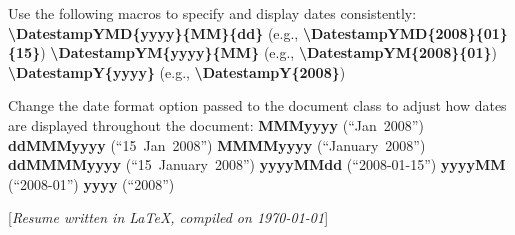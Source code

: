 \documentclass[letterpaper,MMMMyyyy,nonstopmode]{simpleresumecv}
\newcommand{\CVNote}{Resume written in \LaTeX, compiled on {\today}}
\newcommand{\Code}[1]{\mbox{\textbf{#1}}}
\newcommand{\CodeCommand}[1]{\mbox{\textbf{\textbackslash{#1}}}}
\begin{document}
\begin{Body}
\Gap
\BulletItem
Use the following macros to specify and display dates consistently:
\SubBulletItem
\CodeCommand{DatestampYMD\{yyyy\}\{MM\}\{dd\}}
(e.g., \CodeCommand{DatestampYMD\{2008\}\{01\}\{15\}})
\SubBulletItem
\CodeCommand{DatestampYM\{yyyy\}\{MM\}}
(e.g., \CodeCommand{DatestampYM\{2008\}\{01\}})
\SubBulletItem
\CodeCommand{DatestampY\{yyyy\}}
(e.g., \CodeCommand{DatestampY\{2008\}})

\Gap
\BulletItem
Change the date format option passed to the document class to adjust how dates are displayed throughout the document:
\SubBulletItem
\Code{MMMyyyy} (``Jan~2008'')
\SubBulletItem
\Code{ddMMMyyyy} (``15~Jan~2008'')
\SubBulletItem
\Code{MMMMyyyy} (``January~2008'')
\SubBulletItem
\Code{ddMMMMyyyy} (``15~January~2008'')
\SubBulletItem
\Code{yyyyMMdd} (``2008-01-15'')
\SubBulletItem
\Code{yyyyMM} (``2008-01'')
\SubBulletItem
\Code{yyyy} (``2008'')

\endgroup

\fi

\end{Body}


\UseNoteFont%
\null\hfill%
[\textit{\CVNote}]
\end{document}
